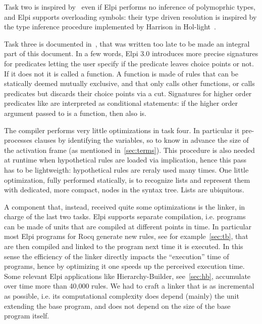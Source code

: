 \documentclass[a4paper, 11pt]{book}
\begin{document}
Task two is inspired by~\cite{10.5555/868728} even if Elpi performs
no inference of polymoprhic types, and Elpi supports overloading
symbols: their type driven resolution is inspired by the type
inference procedure implemented by Harrison in
Hol-light~\cite{10.1007/978-3-642-03359-9_4}.

Task three is documented in~\cite{elpidet}, that was written too late to be
made an integral part of this document. In a few words, Elpi 3.0 introduces more
precise signatures for predicates letting the user specify if the predicate leaves
choice points or not. If it does not it is called a function. A function is made
of rules that can be statically deemed mutually exclusive, and that only calls
other functions, or calls predicates but discards their choice points via a cut.
Signatures for higher order predicates like  are interpreted as
conditional statements: if the higher order argument  passed to
 is a function, then also  is.

The compiler performs very little optimizations in task four. In particular it
pre-processes clauses by identifying the variables, so to know in advance the
size of the activation frame (as mentioned in~\cref{sec:terms}).
This procedure is also needed at runtime when hypothetical rules are loaded
via implication, hence this pass has to be lightweigth: hypothetical rules
are reraly used many times.
One little optimization, fully performed statically, is to recognize lists and
represent them with dedicated, more compact, nodes in the syntax tree. Lists
are ubiquitous.

A component that, instead, received quite some optimizations is the linker, in charge of the
last two tasks. Elpi supports separate compilation, i.e. programs can be made
of units that are compiled at different points in time.
In particular most Elpi programs for Rocq generate new rules, see for
example~\cref{sec:tb}, that are then compiled and linked to the program next
time it is executed. In this sense the efficiency of the linker directly
impacts the ``execution'' time of programs, hence by optimizing it one
speeds up the perceived execution time.\\
Some relevant Elpi applications like Hierarchy-Builder,
see~\cref{sec:hb}, accumulate over time more than 40,000 rules. We had to
craft a linker that is as incremental as possible, i.e. its
computational complexity does depend (mainly) the unit extending the base
program, and does not depend on the size of the base program itself.
\end{document}
